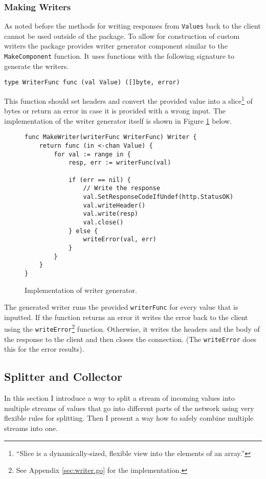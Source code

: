 \subsubsection{Making Writers}
As noted before the methods for writing responses from \texttt{Values}
back to the client cannot be used outside of the package. To allow
for construction of custom writers the package provides writer generator
component similar to the \texttt{MakeComponent} function. It uses 
functions with the following signature to generate the writers.
\begin{lstlisting}
type WriterFunc func (val Value) ([]byte, error)
\end{lstlisting}
This function should set headers and convert the provided value into 
a slice\footnote{``Slice is a dynamically-sized, flexible view into the elements 
of an array.''\cite{tour}} of bytes or return an error in case it 
is provided with a 
wrong input. The implementation of the writer generator itself is shown
in Figure \ref{fig:MakeWriter} below.
\begin{figure}[h]
\centering
\begin{lstlisting}
func MakeWriter(writerFunc WriterFunc) Writer {
    return func (in <-chan Value) {
        for val := range in {
            resp, err := writerFunc(val)

            if (err == nil) {
                // Write the response
                val.SetResponseCodeIfUndef(http.StatusOK)
                val.writeHeader()
                val.write(resp)
                val.close()
            } else {
                writeError(val, err)
            }
        }       
    }
}
\end{lstlisting}
\caption[scale=1.0]{Implementation of writer generator.}
\label{fig:MakeWriter}
\end{figure}

The generated writer runs the provided \texttt{writerFunc} for every value 
that is inputted. If the function returns an error it writes the error 
back to the client using the \texttt{writeError}\footnote{See Appendix 
\ref{sec:writer.go} for the implementation.} function. Otherwise, it 
writes the headers and the body of the response to the client and then 
closes the connection. (The \texttt{writeError} does this for the error
results).

\subsection{Splitter and Collector}
In this section I introduce a way to split a stream of incoming values into
multiple streams of values that go into different parts of the network
using very flexible rules for splitting. Then I present a way how to
safely combine multiple streams into one.

